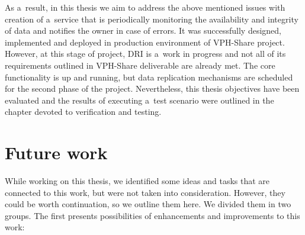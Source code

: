 As a~result, in this thesis we aim to address the above mentioned issues with
creation of a~service that is periodically monitoring the availability and integrity
of data and notifies the owner in case of errors. It was successfully designed,
implemented and deployed in production environment of VPH-Share project. However,
at this stage of project, DRI is a~work in progress and not all of its requirements
outlined in VPH-Share deliverable are already met. The core functionality is up and
running, but data replication mechanisms are scheduled for the second phase of the
project. Nevertheless, this thesis objectives have been evaluated and the results
of executing a~test scenario were outlined in the chapter devoted to verification
and testing.

\section{Future work}
While working on this thesis, we identified some ideas and tasks that are connected
to this work, but were not taken into consideration. However, they could be worth
continuation, so we outline them here. We divided them in two groups. The first presents
possibilities of enhancements and improvements to this work:

